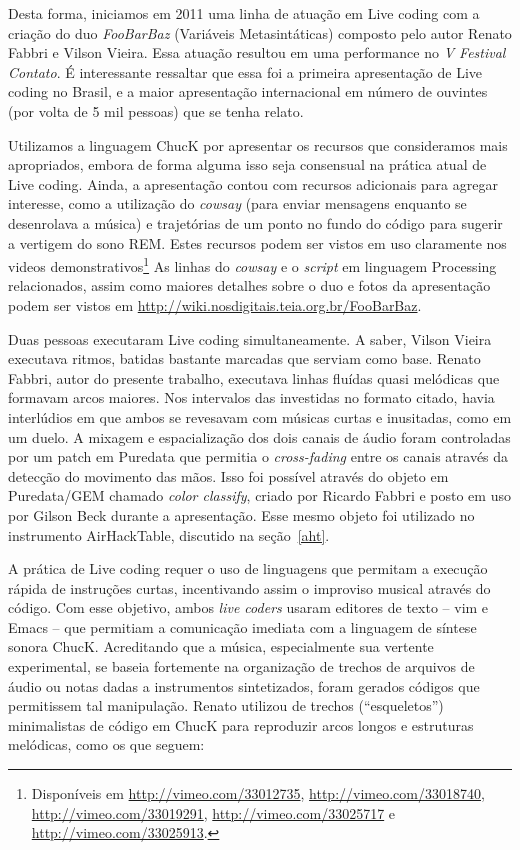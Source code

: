 Desta forma, iniciamos em 2011 uma linha de atuação em Live coding com
a criação do duo \emph{FooBarBaz} (Variáveis Metasintáticas) composto
pelo autor Renato Fabbri e Vilson Vieira. Essa atuação resultou em uma
performance no \emph{V Festival Contato}. É interessante ressaltar que
essa foi a primeira apresentação de Live coding no Brasil, e a maior
apresentação internacional em número de ouvintes (por volta de 5 mil
pessoas) que se tenha relato.

Utilizamos a linguagem ChucK por apresentar os recursos que
consideramos mais apropriados, embora de forma alguma isso seja
consensual na prática atual de Live coding. Ainda, a apresentação
contou com recursos adicionais para agregar interesse, como a
utilização do \emph{cowsay} (para enviar mensagens enquanto se
desenrolava a música) e trajetórias de um ponto no fundo do código
para sugerir a vertigem do sono REM. Estes recursos podem ser vistos
em uso claramente nos videos demonstrativos\footnote{Disponíveis em
  \url{http://vimeo.com/33012735}, \url{http://vimeo.com/33018740},
  \url{http://vimeo.com/33019291}, \url{http://vimeo.com/33025717} e
  \url{http://vimeo.com/33025913}.}  As linhas do \emph{cowsay} e o
\emph{script} em linguagem Processing relacionados, assim como maiores
detalhes sobre o duo e fotos da apresentação podem ser vistos em
\url{http://wiki.nosdigitais.teia.org.br/FooBarBaz}.

Duas pessoas executaram Live coding simultaneamente. A saber, Vilson
Vieira executava ritmos, batidas bastante marcadas que serviam como
base. Renato Fabbri, autor do presente trabalho, executava linhas
fluídas quasi melódicas que formavam arcos maiores. Nos intervalos das
investidas no formato citado, havia interlúdios em que ambos se
revesavam com músicas curtas e inusitadas, como em um duelo. A mixagem
e espacialização dos dois canais de áudio foram controladas por um
patch em Puredata que permitia o \textit{cross-fading} entre os canais
através da detecção do movimento das mãos. Isso foi possível através
do objeto em Puredata/GEM chamado \emph{color classify}, criado por
Ricardo Fabbri e posto em uso por Gilson Beck durante a
apresentação. Esse mesmo objeto foi utilizado no instrumento
AirHackTable, discutido na seção~\ref{aht}.

A prática de Live coding requer o uso de linguagens que permitam a
execução rápida de instruções curtas, incentivando assim o improviso
musical através do código. Com esse objetivo, ambos \emph{live coders}
usaram editores de texto -- vim e Emacs -- que permitiam a comunicação
imediata com a linguagem de síntese sonora ChucK.  Acreditando que a
música, especialmente sua vertente experimental, se baseia fortemente
na organização de trechos de arquivos de áudio ou notas dadas a
instrumentos sintetizados, foram gerados códigos que permitissem tal
manipulação. Renato utilizou de trechos (``esqueletos'') minimalistas
de código em ChucK para reproduzir arcos longos e estruturas
melódicas, como os que seguem:


